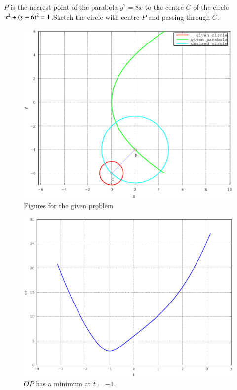 \documentclass[journal,12pt,twocolumn]{IEEEtran}
\begin{document}
\begin{problem}
$P$ is the nearest point of the parabola $y^2=8x$ to the centre $C$ of the circle $x^2+\left(y+6\right)^2=1$.Sketch the circle with centre $P$ and passing through $C$.
\end{problem}
\solution


\renewcommand{\thefigure}{\theproblem.\arabic{figure}}
\begin{figure}[h]
\centering
\includegraphics[width=\columnwidth]{./version_2/ee16b1037/ee16b1037a}
\caption{ Figures for the given problem}
\end{figure}
%
\begin{figure}[h]
\centering
\includegraphics[width=\columnwidth]{./version_2/ee16b1037/ee16b1037b}
\caption{ $OP$ has a minimum at $t = -1$.}
\end{figure}
\end{document}

